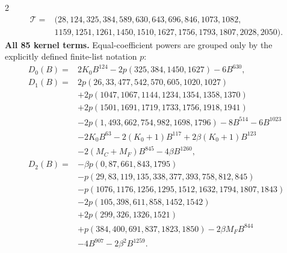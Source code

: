 \documentclass[10pt]{article}
\begin{document}
\begin{multicols}{2}
\[\begin{aligned}
\mathcal T={}&(28,124,325,384,589,630,643,696,846,1073,1082,\\
 &1159,1251,1261,1450,1510,1627,1756,1793,1807,2028,2050).
\end{aligned}
\]
\textbf{All 85 kernel terms.} Equal-coefficient powers are grouped only by
the explicitly defined finite-list notation $p$:
\[
\begin{aligned}
D_0(B)={}&2K_0B^{124}-2p(325,384,1450,1627)-6B^{630},\\
D_1(B)={}&2p(26,33,477,542,570,605,1020,1027)\\
 &+2p(1047,1067,1144,1234,1354,1358,1370)\\
 &+2p(1501,1691,1719,1733,1756,1918,1941)\\
 &-2p(1,493,662,754,982,1698,1796)-8B^{514}-6B^{1023}\\
 &-2K_0B^{63}-2(K_0+1)B^{117}+2\beta(K_0+1)B^{123}\\
 &-2(M_C+M_F)B^{845}-4\beta B^{1260},\\
D_2(B)={}&-\beta p(0,87,661,843,1795)\\
 &-p(29,83,119,135,338,377,393,758,812,845)\\
 &-p(1076,1176,1256,1295,1512,1632,1794,1807,1843)\\
 &-2p(105,398,611,858,1452,1542)\\
 &+2p(299,326,1326,1521)\\
 &+p(384,400,691,837,1823,1850)-2\beta M_FB^{844}\\
 &-4B^{907}-2\beta^2B^{1259}.
\end{aligned}
\]


\end{multicols}
\end{document}
